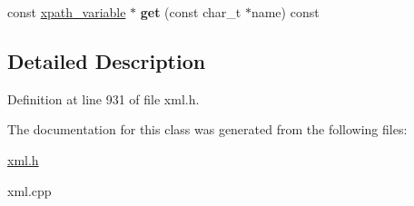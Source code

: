 \begin{DoxyCompactItemize}
\item 
\hypertarget{classphys_1_1xml_1_1xpath__variable__set_a719e167cebc050d4baa11925f3302380}{
const \hyperlink{classphys_1_1xml_1_1xpath__variable}{xpath\_\-variable} $\ast$ {\bfseries get} (const char\_\-t $\ast$name) const }
\label{d8/d65/classphys_1_1xml_1_1xpath__variable__set_a719e167cebc050d4baa11925f3302380}

\end{DoxyCompactItemize}


\subsection{Detailed Description}


Definition at line 931 of file xml.h.



The documentation for this class was generated from the following files:\begin{DoxyCompactItemize}
\item 
\hyperlink{xml_8h}{xml.h}\item 
xml.cpp\end{DoxyCompactItemize}
